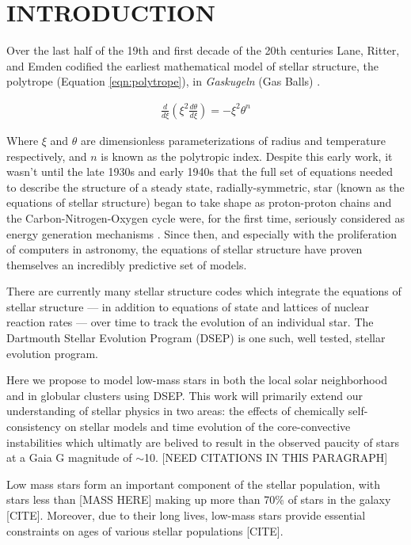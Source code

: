 \section{INTRODUCTION}
Over the last half of the 19th and first decade of the 20th centuries Lane,
Ritter, and Emden codified the earliest mathematical model of stellar
structure, the polytrope (Equation \ref{eqn:polytrope}), in \textit{Gaskugeln}
(Gas Balls) \citep{Emden1907}.

\begin{align}\label{eqn:polytrope}
	\frac{d}{d\xi}\left(\xi^{2}\frac{d\theta}{d\xi}\right) = -\xi^{2}\theta^{n}
\end{align}

Where $\xi$ and $\theta$ are dimensionless parameterizations of radius and
temperature respectively, and $n$ is known as the polytropic index. Despite this
early work, it wasn't until the late 1930s and early 1940s that the full set of
equations needed to describe the structure of a steady state,
radially-symmetric, star (known as the equations of stellar structure) began to
take shape as proton-proton chains and the Carbon-Nitrogen-Oxygen cycle were,
for the first time, seriously considered as energy generation mechanisms
\citep{Cowling1966}. Since then, and especially with the proliferation of
computers in astronomy, the equations of stellar structure have proven
themselves an incredibly predictive set of models.  

There are currently many stellar structure codes \citep[e.g.][]{Dotter2008,
Kovetz2009, Paxton2011} which integrate the equations of stellar structure ---
in addition to equations of state and lattices of nuclear reaction rates ---
over time to track the evolution of an individual star. The Dartmouth Stellar
Evolution Program (DSEP) \citep{Chaboyer2001, Bjork2006, Dotter2008} is one
such, well tested, stellar evolution program.

Here we propose to model low-mass stars in both the local solar neighborhood
and in globular clusters using DSEP. This work will primarily extend our
understanding of stellar physics in two areas: the effects of chemically
self-consistency on stellar models and time evolution of the core-convective
instabilities which ultimatly are belived to result in the observed paucity of
stars at a Gaia G magnitude of $\sim$10. [NEED CITATIONS IN THIS PARAGRAPH]

Low mass stars form an important component of the stellar population, with
stars less than [MASS HERE] making up more than 70\% of stars in the galaxy
[CITE]. Moreover, due to their long lives, low-mass stars provide essential
constraints on ages of various stellar populations [CITE].

